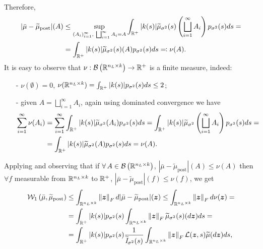 Therefore,
\begin{equation*}
	\begin{aligned}
		|\bar{\mu} - \widetilde{\mu}_\mathrm{post}|(A) & \leq \sup_{\left(A_i\right)_{i = 1}^{\infty}, \ \bigsqcup_{i = 1}^{\infty} A_i = A} \int_{\real^+} |k(s)| \widetilde{\mu}_{\sigma^2}(s)\left(\bigsqcup_{i = 1}^\infty A_i\right) p_{\sigma^2}(s) ds = \\
		& = \int_{\real^+} |k(s)| \widetilde{\mu}_{\sigma^2}(s)(A) p_{\sigma^2}(s) ds \eqcolon \nu(A).
	\end{aligned}
\end{equation*}
It is easy to observe that $\nu: \borel{\real^{n_L \times k}} \to \real^+$ is a finite measure, indeed:
\begin{itemize}
	\item[-] $\nu(\emptyset) = 0$, $\nu(\real^{n_L \times k}) = \int_{\real^+} |k(s)| p_{\sigma^2}(s) ds \leq 2$;
	\item[-] given $A = \bigsqcup_{i = 1}^{\infty} A_i$, again using dominated convergence we have
		\begin{equation*}
			\begin{aligned}
				\sum_{i = 1}^{\infty} \nu(A_i) & = \sum_{i = 1}^{\infty} \int_{\real^+} |k(s)| \widetilde{\mu}_{\sigma^2}(A_i) p_{\sigma^2}(s) ds = \int_{\real^+} |k(s)| \widetilde{\mu}_{\sigma^2}\left(\bigsqcup_{i = 1}^{\infty} A_i\right) p_{\sigma^2}(s) ds = \\
				& = \int_{\real^+} |k(s)| \widetilde{\mu}_{\sigma^2}(A) p_{\sigma^2}(s) ds = \nu(A).
			\end{aligned}
		\end{equation*}
\end{itemize}
Applying  and observing that if $\forall A \in \borel{\real^{n_L \times k}}$, $|\bar{\mu} - \widetilde{\mu}_\mathrm{post}|(A) \leq \nu(A)$ then $\forall f$ measurable from $\real^{n_L \times k}$ to $\real^+$, $|\bar{\mu} - \widetilde{\mu}_\mathrm{post}|(f) \leq \nu(f)$, we get
\begin{align} 
	\wass[1]{\bar{\mu}}{\widetilde{\mu}_{\mathrm{post}}} & \leq \int_{\real^{n_L \times k}} \norm{\bm{z}}_F d |\bar{\mu} - \widetilde{\mu}_\mathrm{post}|(\bm{z}) \leq \int_{\real^{n_L \times k}} \norm{\bm{z}}_F d \nu(\bm{z}) = \nonumber \\
	& = \int_{\real^+} |k(s)| p_{\sigma^2}(s) \int_{\real^{n_L \times k}} \norm{\bm{z}}_F \widetilde{\mu}_{\sigma^2}(s)(d \bm{z}) ds = \nonumber \\
	& = \int_{\real^+} |k(s)| p_{\sigma^2}(s) \frac{1}{\widetilde{\mathit{I}}_{\sigma^2}(s)} \int_{\real^{n_L \times k}} \norm{\bm{z}}_F \mathcal{L}(\bm{z}, s) \widetilde{\mu}(d\bm{z}) ds, \label{eq:wassbound1}
\end{align}
